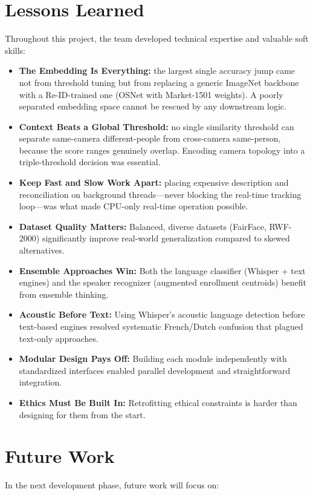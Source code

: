 \documentclass[12pt]{report}
\begin{document}
\section{Lessons Learned}
Throughout this project, the team developed technical expertise and valuable soft skills:
\begin{itemize}
    \item \textbf{The Embedding Is Everything:} the largest single accuracy jump came not from threshold tuning but from replacing a generic ImageNet backbone with a Re-ID-trained one (OSNet with Market-1501 weights). A poorly separated embedding space cannot be rescued by any downstream logic.
    \item \textbf{Context Beats a Global Threshold:} no single similarity threshold can separate same-camera different-people from cross-camera same-person, because the score ranges genuinely overlap. Encoding camera topology into a triple-threshold decision was essential.
    \item \textbf{Keep Fast and Slow Work Apart:} placing expensive description and reconciliation on background threads---never blocking the real-time tracking loop---was what made CPU-only real-time operation possible.
    \item \textbf{Dataset Quality Matters:} Balanced, diverse datasets (FairFace, RWF-2000) significantly improve real-world generalization compared to skewed alternatives.
    \item \textbf{Ensemble Approaches Win:} Both the language classifier (Whisper + text engines) and the speaker recognizer (augmented enrollment centroids) benefit from ensemble thinking.
    \item \textbf{Acoustic Before Text:} Using Whisper's acoustic language detection before text-based engines resolved systematic French/Dutch confusion that plagued text-only approaches.
    \item \textbf{Modular Design Pays Off:} Building each module independently with standardized interfaces enabled parallel development and straightforward integration.
    \item \textbf{Ethics Must Be Built In:} Retrofitting ethical constraints is harder than designing for them from the start.
\end{itemize}

\section{Future Work}
In the next development phase, future work will focus on:
\end{document}
